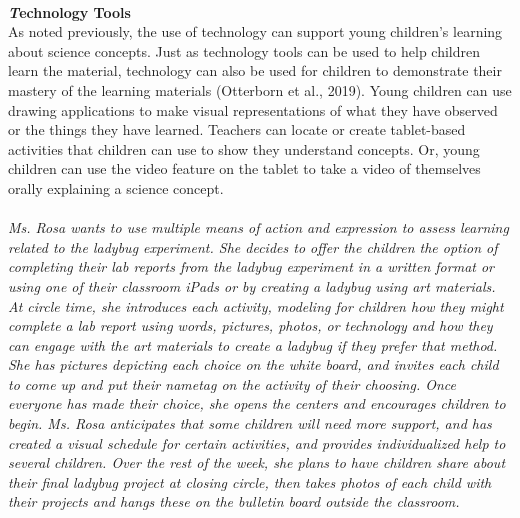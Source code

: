 \documentclass[11.5pt]{sig-alternate}
\begin{document}
\begin{large}
\\
\textbf{\emph Technology Tools }\\
As noted previously, the use of technology can support young children’s learning about science concepts. Just as technology tools can be used to help children learn the material, technology can also be used for children to demonstrate their mastery of the learning materials (Otterborn et al., 2019). Young children can use drawing applications to make visual representations of what they have observed or the things they have learned. Teachers can locate or create tablet-based activities that children can use to show they understand concepts. Or, young children can use the video feature on the tablet to take a video of themselves orally explaining a science concept. 
\\\\
\textit{Ms. Rosa wants to use multiple means of action and expression to assess learning related to the ladybug experiment. She decides to offer the children the option of completing their lab reports from the ladybug experiment in a written format or using one of their classroom iPads or by creating a ladybug using art materials. At circle time, she introduces each activity, modeling for children how they might complete a lab report using words, pictures, photos, or technology and how they can engage with the art materials to create a ladybug if they prefer that method. She has pictures depicting each choice on the white board, and invites each child to come up and put their nametag on the activity of their choosing. Once everyone has made their choice, she opens the centers and encourages children to begin. Ms. Rosa anticipates that some children will need more support, and has created a visual schedule for certain activities, and provides individualized help to several children. Over the rest of the week, she plans to have children share about their final ladybug project at closing circle, then takes photos of each child with their projects and hangs these on the bulletin board outside the classroom. }


\end{large}
\end{document}
